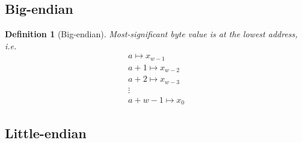 \documentclass[10pt]{amsart}
\newtheorem{definition}{Definition}
\begin{document}
\subsection{Big-endian}

\begin{definition}[Big-endian]
	Most-significant byte value is at the lowest address, i.e. 
	\begin{equation}
	\begin{gathered}
	a \mapsto x_{w-1} \\
	a+1 \mapsto x_{w-2} \\ 
	a+2 \mapsto x_{w-3} \\ 
	\vdots \\
	a+w - 1 \mapsto x_0 
	\end{gathered}
	\end{equation}
\end{definition} 

\subsection{Little-endian}
\end{document}
